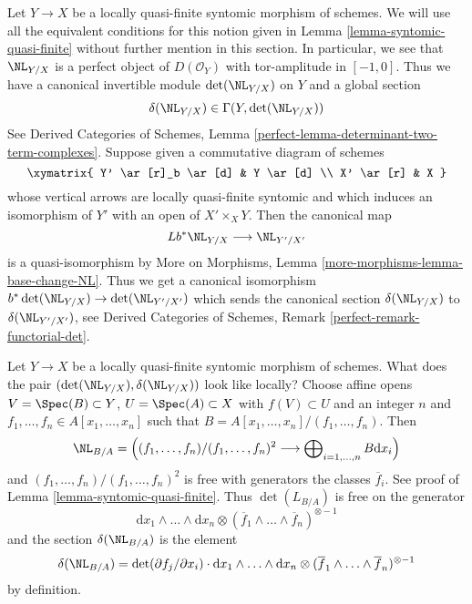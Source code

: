 \medskip\noindent
Let $Y \to X$ be a locally quasi-finite syntomic morphism of schemes.
We will use all the equivalent conditions for this notion given in
Lemma \ref{lemma-syntomic-quasi-finite} without further mention in
this section. In particular, we see that $\NL_{Y/X}$ is a perfect
object of $D(\mathcal{O}_Y)$ with tor-amplitude in $[-1, 0]$. Thus
we have a canonical invertible module
$\det(\NL_{Y/X})$ on $Y$ and a global section
$$
\delta(\NL_{Y/X}) \in \Gamma(Y, \det(\NL_{Y/X}))
$$
See Derived Categories of Schemes, Lemma
\ref{perfect-lemma-determinant-two-term-complexes}.
Suppose given a commutative diagram of schemes
$$
\xymatrix{
Y' \ar[r]_b \ar[d] & Y \ar[d] \\
X' \ar[r] & X
}
$$
whose vertical arrows are locally quasi-finite syntomic and which
induces an isomorphism of $Y'$ with an open of $X' \times_X Y$.
Then the canonical map
$$
Lb^*\NL_{Y/X} \longrightarrow \NL_{Y'/X'}
$$
is a quasi-isomorphism by
More on Morphisms, Lemma \ref{more-morphisms-lemma-base-change-NL}.
Thus we get a canonical isomorphism
$b^*\det(\NL_{Y/X}) \to \det(\NL_{Y'/X'})$ which sends the
canonical section $\delta(\NL_{Y/X})$ to $\delta(\NL_{Y'/ X'})$, see
Derived Categories of Schemes, Remark \ref{perfect-remark-functorial-det}.

\begin{remark}
\label{remark-local-description-delta}
Let $Y \to X$ be a locally quasi-finite syntomic morphism of schemes.
What does the pair $(\det(\NL_{Y/X}), \delta(\NL_{Y/X}))$ look
like locally? Choose affine opens $V = \Spec(B) \subset Y$,
$U = \Spec(A) \subset X$ with $f(V) \subset U$ and an integer $n$ and
$f_1, \ldots, f_n \in A[x_1, \ldots, x_n]$ such that
$B = A[x_1, \ldots, x_n]/(f_1, \ldots, f_n)$. Then
$$
\NL_{B/A} = \left(
(f_1, \ldots, f_n)/(f_1, \ldots, f_n)^2
\longrightarrow
\bigoplus\nolimits_{i = 1, \ldots, n} B \text{d} x_i\right)
$$
and $(f_1, \ldots, f_n)/(f_1, \ldots, f_n)^2$ is free with generators
the classes $\overline{f}_i$. See proof of
Lemma \ref{lemma-syntomic-quasi-finite}.
Thus $\det(L_{B/A})$ is free on the generator
$$
\text{d}x_1 \wedge \ldots \wedge \text{d}x_n
\otimes
(\overline{f}_1 \wedge \ldots \wedge \overline{f}_n)^{\otimes -1}
$$
and the section $\delta(\NL_{B/A})$ is the element
$$
\delta(\NL_{B/A}) =
\det(\partial f_j/ \partial x_i) \cdot
\text{d}x_1 \wedge \ldots \wedge \text{d}x_n
\otimes
(\overline{f}_1 \wedge \ldots \wedge \overline{f}_n)^{\otimes -1}
$$
by definition.
\end{remark}

